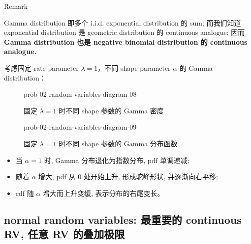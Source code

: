 \begin{qlremark}{Remark}

Gamma distribution 即多个 i.i.d. exponential distribution 的 sum; 而我们知道 exponential distribution 是 geometric distribution 的 continuous analogue; 因而 \textbf{Gamma distribution 也是 negative binomial distribution 的 continuous analogue.}

考虑固定 rate parameter \(\mathit{\lambda} = 1\)，不同 shape parameter \(\mathit{\alpha}\) 的 Gamma distribution：

\begin{figure}[htbp]
\centering
\begin{qldrawing}
\csname prob-02-random-variables-diagram-08\endcsname
\end{qldrawing}

\caption{固定 \(\mathit{\lambda} = 1\) 时不同 shape 参数的 Gamma 密度}

\label{fig-prob-02-random-variables-diagram-08}

\end{figure}

\begin{figure}[htbp]
\centering
\begin{qldrawing}
\csname prob-02-random-variables-diagram-09\endcsname
\end{qldrawing}

\caption{固定 \(\mathit{\lambda} = 1\) 时不同 shape 参数的 Gamma 分布函数}

\label{fig-prob-02-random-variables-diagram-09}

\end{figure}

\begin{itemize}
\item
  当 \(\mathit{\alpha} = 1\) 时, Gamma 分布退化为指数分布, pdf 单调递减;
\item
  随着 \(\mathit{\alpha}\) 增大, pdf 从 0 处开始上升, 形成驼峰形状, 并逐渐向右平移;
\item
  cdf 随 \(\mathit{\alpha}\) 增大而上升变缓, 表示分布的右尾变长。
\end{itemize}

\end{qlremark}

\subsection{normal random variables: 最重要的 continuous RV, 任意 RV 的叠加极限}\label{normal-random-variables-ux6700ux91cdux8981ux7684-continuous-rv-ux4efbux610f-rv-ux7684ux53e0ux52a0ux6781ux9650}

